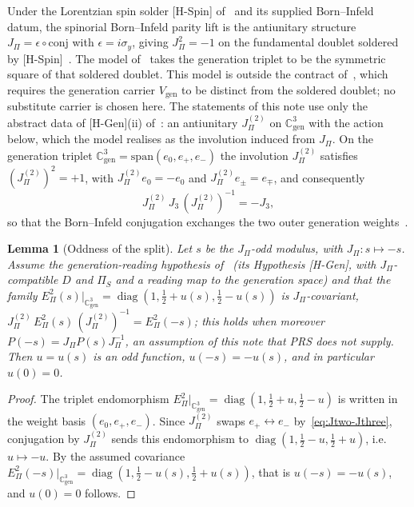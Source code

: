 \documentclass[11pt]{article}
\newtheorem{lemma}{Lemma}
\theoremstyle{definition}
\theoremstyle{remark}
\newcommand{\JPi}{J_{\Pi}}
\newcommand{\Jtwo}{J_{\Pi}^{(2)}}
\newcommand{\Jthree}{J_{3}}
\newcommand{\Cgen}{\mathbb{C}^{3}_{\mathrm{gen}}}
\newcommand{\Epi}{E_{\Pi}}
\newcommand{\diag}{\operatorname{diag}}
\begin{document}
    Under the Lorentzian spin solder [H-Spin] of~\cite{Beau2026q14} and its supplied Born--Infeld datum, the spinorial
    Born--Infeld parity lift is the antiunitary structure $\JPi = \epsilon \circ \mathrm{conj}$ with
    $\epsilon = i\sigma_y$, giving $\JPi^2 = -1$ on the fundamental doublet soldered by [H-Spin]~\cite{Beau2026q14, Beau2026prs}.
    The model of~\cite{Beau2026prs} takes the generation triplet to be the symmetric square of that soldered doublet.
    This model is outside the contract of~\cite{Beau2026q14}, which requires the generation carrier $V_{\mathrm{gen}}$ to be
    distinct from the soldered doublet; no substitute carrier is chosen here.
    The statements of this note use only the abstract data of [H-Gen](ii) of~\cite{Beau2026prs}: an antiunitary $\Jtwo$ on
    $\Cgen$ with the action below, which the model realises as the involution induced from $\JPi$.
    On the generation triplet $\Cgen = \mathrm{span}(e_0, e_+, e_-)$ the involution $\Jtwo$ satisfies
    $(\Jtwo)^2 = +1$, with $\Jtwo e_0 = -e_0$ and $\Jtwo e_\pm = e_\mp$, and consequently
    \begin{equation}
      \label{eq:Jtwo-Jthree}
      \Jtwo \, \Jthree \, (\Jtwo)^{-1} = -\Jthree ,
    \end{equation}
    so that the Born--Infeld conjugation exchanges the two outer generation weights~\cite{Beau2026prs}.

    \begin{lemma}[Oddness of the split]
      \label{lem:u-odd}
      Let $s$ be the $\JPi$-odd modulus, with $\JPi : s \mapsto -s$.
      Assume the generation-reading hypothesis of~\cite{Beau2026prs} (its Hypothesis [H-Gen], with $J_\Pi$-compatible
      $D$ and $\Pi_S$ and a reading map to the generation space) and that the family
      $\Epi^2(s)|_{\Cgen}=\diag(1,\tfrac12+u(s),\tfrac12-u(s))$ is
      $\JPi$-covariant, $\Jtwo\,\Epi^2(s)\,(\Jtwo)^{-1}=\Epi^2(-s)$; this holds when moreover
      $P(-s)=\JPi P(s)\JPi^{-1}$, an assumption of this note that PRS does not supply.
      Then $u = u(s)$ is an odd function, $u(-s) = -u(s)$, and in particular $u(0) = 0$.
    \end{lemma}

    \begin{proof}
      The triplet endomorphism $\Epi^2|_{\Cgen} = \diag(1, \tfrac12 + u, \tfrac12 - u)$ is written in the weight basis
      $(e_0, e_+, e_-)$.
      Since $\Jtwo$ swaps $e_+ \leftrightarrow e_-$ by~\eqref{eq:Jtwo-Jthree}, conjugation by $\Jtwo$ sends this endomorphism
      to
      $\diag(1, \tfrac12 - u, \tfrac12 + u)$, i.e.\ $u \mapsto -u$.
      By the assumed covariance $\Epi^2(-s)|_{\Cgen}=\diag(1,\tfrac12-u(s),\tfrac12+u(s))$, that is $u(-s)=-u(s)$,
      and $u(0)=0$ follows.
    \end{proof}
\end{document}
